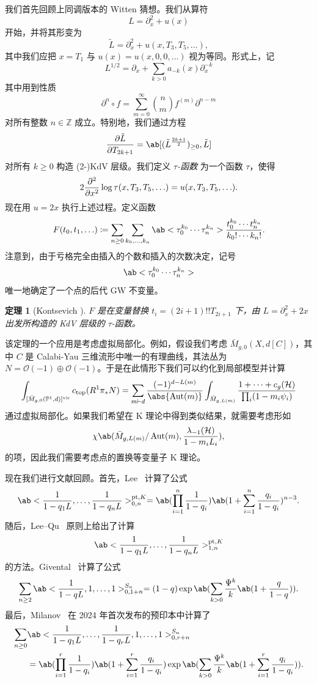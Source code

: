\documentclass{amsart}
\newtheorem{thm}{定理}[section]
\theoremstyle{definition}
\theoremstyle{remark}
\theoremstyle{plain}
\theoremstyle{definition}
\theoremstyle{remark}
\newcommand{\Z}{\mathbb{Z}}
\renewcommand{\P}{\mathbb{P}}
\newcommand{\mc}[1]{\mathcal{#1}}
\newcommand{\mr}[1]{\mathrm{#1}}
\newcommand{\1}{\mathbf{1}}
\newcommand{\2}{\mathbf{2}}
\newcommand{\3}{\mathbf{3}}
\newcommand{\vir}{\mr{vir}}
\DeclareMathOperator{\Aut}{Aut}
\begin{document}
我们首先回顾上同调版本的 Witten 猜想。我们从算符
\[ L = \partial_x^2 + u(x) \]
开始，并将其形变为
\[ \tilde{L} = \partial_x^2 + u(x, T_3, T_5, \ldots), \]
其中我们应把 \(x = T_1\) 与 \(u(x) = u(x, 0, 0,\ldots)\) 视为等同。形式上，记
\[ L^{1/2} = \partial_x + \sum_{k > 0} a_{-k}(x) \partial_x^{-k} \]
其中用到性质
\[ \partial^n \circ f = \sum_{m = 0}^{\infty} \binom{n}{m} f^{(m)} \partial^{n-m} \]
对所有整数 \(n \in \Z\) 成立。特别地，我们通过方程
\[ \pdv{\tilde{L}}{T_{2k+1}} = \ab[(\tilde{L}^{\frac{2k+1}{2}})_{\geq 0}, \tilde{L}] \]
对所有 \(k \geq 0\) 构造 (2-)KdV 层级。我们定义 \textit{\(\tau\)-函数} 为一个函数 \(\tau\)，使得
\[ 2 \pdv[2]{}{x}\log \tau(x, T_3, T_5, \ldots) = u(x, T_3, T_5, \ldots). \]
现在用 \(u = 2x\) 执行上述过程。定义函数
\[ F(t_0, t_1, \ldots) \coloneqq \sum_{n \geq 0} \sum_{k_0, \ldots, k_n} \ab<\tau_0^{k_0} \cdots \tau_n^{k_n}> \frac{t_0^{k_0} \cdots t_n^{k_n}}{k_0! \cdots k_n!}. \]
注意到，由于亏格完全由插入的个数和插入的次数决定，记号
\[ \ab<\tau_0^{k_0} \cdots \tau_n^{k_n}> \]
唯一地确定了一个点的后代 GW 不变量。

\begin{thm}[Kontsevich {\cite{Kontsevich1992}}]
    \(F\) 是在变量替换 \(t_i = (2i+1)!! T_{2i+1}\) 下，由 \(L = \partial_x^2 + 2x\) 出发所构造的 KdV 层级的 \(\tau\)-函数。
\end{thm}

该定理的一个应用是考虑虚拟局部化。例如，假设我们考虑 \(\bar{M}_{g,0}(X, d[C])\)，其中 \(C\) 是 Calabi-Yau 三维流形中唯一的有理曲线，其法丛为 \(N = \mc{O}(-1)\oplus \mc{O}(-1)\)。于是在此情形下我们可以约化到局部模型并计算
\begin{align*}
    \int_{[\bar{M}_{g,0}(\P^1, d)]^{\vir}} c_{\mr{top}}(R^1 \pi_* N) = \sum_{m \vdash d} \frac{(-1)^{d-L(m)}}{\abs{\Aut(m)}} \int_{\bar{M}_{g, L(m)}} \frac{1 + \cdots + c_g(\mc{H})}{\prod_i (1-m_i \psi_i)}
\end{align*}
通过虚拟局部化。如果我们希望在 K 理论中得到类似结果，就需要考虑形如
\[ \chi\ab(\bar{M}_{g, L(m)}/\Aut(m), \frac{\lambda_{-1}(\mc{H})}{1-m_i L_i}), \]
的项，因此我们需要考虑点的置换等变量子 K 理论。

现在我们进行文献回顾。首先，Lee~\cite{Lee1997} 计算了公式
\[ \ab<\frac{1}{1-q_1 L}, \ldots, \frac{1}{1-q_n L}>_{0,n}^{\mr{pt}, K} = \ab(\prod_{i=1}^n \frac{1}{1-q_i}) \ab(1 + \sum_{i=1}^n \frac{q_i}{1-q_i})^{n-3}. \]
随后，Lee--Qu~\cite{LeeQu2014} 原则上给出了计算
\[ \ab<\frac{1}{1-q_1 L}, \ldots, \frac{1}{1-q_n L}>_{1,n}^{\mr{pt}, K} \]
的方法。Givental~\cite{Givental2017K1} 计算了公式
\[ \sum_{n \geq 2} \ab<\frac{1}{1-q L}, 1, \ldots, 1>_{0,1+n}^{S_n} = (1-q) \exp\ab(\sum_{k > 0} \frac{\Psi^k}{k} \ab(1 + \frac{q}{1-q})). \]
最后，Milanov~\cite{Milanov2025} 在 2024 年首次发布的预印本中计算了
\begin{align*}
    \sum_{n \geq 0}& \ab<\frac{1}{1-q_1 L}, \ldots, \frac{1}{1-q_r L}, 1, \ldots, 1>_{0,r+n}^{S_n} \\
    &= \ab(\prod_{i=1}^{r} \frac{1}{1-q_i})\ab(1 + \sum_{i=1}^r \frac{q_i}{1-q_i}) \exp\ab(\sum_{k > 0} \frac{\Psi^k}{k} \ab(1 + \sum_{i=1}^r \frac{q_i}{1-q_i})). 
\end{align*}
\end{document}
